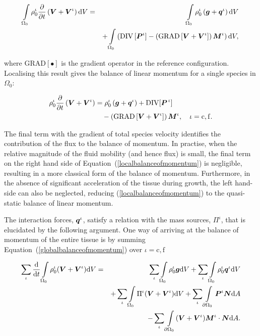 \begin{eqnarray}
\int\limits_{\Omega_0} \rho_0^\iota\frac{\partial}{\partial
  t}\left(\mbox{\boldmath$ V$}+\mbox{\boldmath$ V$}^\iota\right) \mathrm{d}V &=&
\int\limits_{\Omega_0}\rho^\iota_0\left(\mbox{\boldmath$ g$}+\mbox{\boldmath$ q$}^\iota\right)
\mathrm{d}V \nonumber\\ & &+
\int\limits_{\Omega_0}\left(\mathrm{DIV}\left[\mbox{\boldmath$ P$}^\iota\right] -
\left(\mathrm{GRAD}\left[\mbox{\boldmath$ V$}+\mbox{\boldmath$ V$}^\iota\right]\right)\mbox{\boldmath$ M$}^\iota\right)
\mathrm{d}V, \nonumber
\end{eqnarray}

\noindent where $\mathrm{{GRAD}[\bullet]}$ is the gradient operator in
the reference configuration. Localising this result gives the balance
of linear momentum for a single species in $\Omega_{0}$:

\begin{equation}
\begin{split}
\rho_0^\iota\frac{\partial}{\partial t}\left(\mbox{\boldmath$ V$}+\mbox{\boldmath$ V$}^\iota\right) &
=\rho^\iota_0\left(\mbox{\boldmath$ g$}+\mbox{\boldmath$ q$}^\iota\right) +
\mathrm{DIV}[\mbox{\boldmath$ P$}^{\,\iota}]\\ & \quad -\left(\mathrm{GRAD}\left[\mbox{\boldmath$ V$}+
  \mbox{\boldmath$ V$}^\iota\right]\right)\mbox{\boldmath$ M$}^\iota, \quad \iota = \mathrm{c,f}.
\label{localbalanceofmomentum}
\end{split}
\end{equation} 

The final term with the gradient of total species velocity identifies
the contribution of the flux to the balance of momentum. In practise,
when the relative magnitude of the fluid mobility (and hence flux) is
small, the final term on the right hand side of
Equation~(\ref{localbalanceofmomentum}) is negligible, resulting in a
more classical form of the balance of momentum. Furthermore, in the
absence of significant acceleration of the tissue during growth, the
left hand-side can also be neglected, reducing
(\ref{localbalanceofmomentum}) to the quasi-static balance of linear
momentum.

The interaction forces, $\mbox{\boldmath$ q$}^\iota$, satisfy a relation with the mass
sources, $\Pi^\iota$, that is elucidated by the following
argument. One way of arriving at the balance of momentum of the entire
tissue is by summing Equation~(\ref{globalbalanceofmomentum}) over
$\iota = \mathrm{c,f}$

\begin{eqnarray}
\sum\limits_{\iota}\frac{\mathrm{d}}{\mathrm{d}t}
\int\limits_{\Omega_0} \rho_0^\iota(\mbox{\boldmath$ V$}+\mbox{\boldmath$ V$}^\iota) \mathrm{d}V &=&
\sum\limits_{\iota}\int\limits_{\Omega_0} \rho^\iota_0\mbox{\boldmath$ g$} \mathrm{d}V
+ \sum\limits_{\iota}\int\limits_{\Omega_0} \rho^\iota_0\mbox{\boldmath$ q$}^\iota
\mathrm{d}V\nonumber\\& & + \sum\limits_{\iota}\int\limits_{\Omega_0}
\Pi^\iota(\mbox{\boldmath$ V$}+\mbox{\boldmath$ V$}^\iota) \mathrm{d}V + \sum\limits_{\iota}
\int\limits_{\partial \Omega_0}\mbox{\boldmath$ P$}^\iota\mbox{\boldmath$ N$} \mathrm{d}A\nonumber\\ & &
- \sum\limits_{\iota}\int\limits_{\partial
  \Omega_0}(\mbox{\boldmath$ V$}+\mbox{\boldmath$ V$}^\iota)\mbox{\boldmath$ M$}^\iota\cdot\mbox{\boldmath$ N$} \mathrm{d}A.
\label{momentumsummation}
\end{eqnarray}

